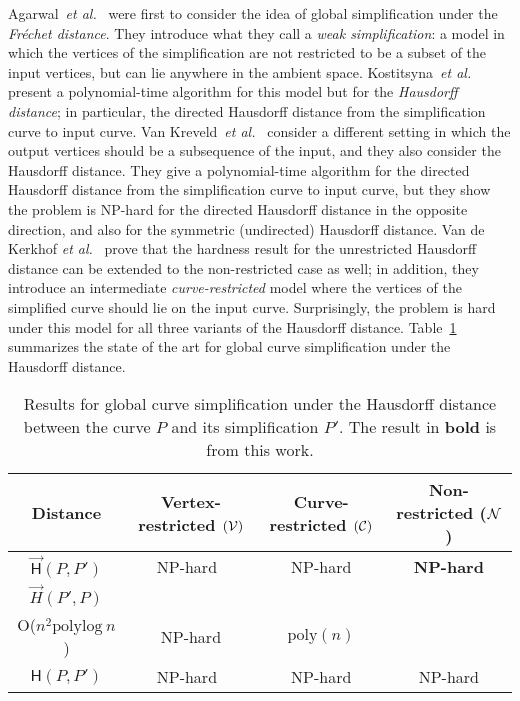 \documentclass[]{llncs}
\newcommand{\etal}{{\it et al.\xspace}}
\def\C{{\cal C}}
\def\N{{\cal N}}
\def\V{{\cal V}}
\newcommand{\Hausdorff}{\mathsf{H}}
\newcommand{\diHausdorff}{\overrightarrow{\mathsf{H}}}
\newcommand {\tablecell}[1]
{
  \begin {minipage} {3.5cm}
  \centering
  #1
  \end {minipage}
}
\newcommand {\tablerow}[4]
{
  #1
  & \tablecell{#2}
  & \tablecell{#3}
  & \tablecell{#4}
  \\
}
\newcommand{\polylog}{\mathrm{polylog}}
\newcommand{\poly}{\mathrm{poly}}
\begin{document}
Agarwal~\etal~\cite {ahmw-nltaa-05} were first to consider the idea of global simplification under the {\em Fr\'echet distance}. They introduce what they call a {\em weak simplification}: a model in which the vertices of the simplification are not restricted to be a subset of the input vertices, but can lie anywhere in the ambient space. 
Kostitsyna~\etal~\cite{klps-ocmlpp-17} present a polynomial-time algorithm for this model but for the {\em Hausdorff distance}; in particular, the directed  Hausdorff distance from the simplification curve to input curve.
Van Kreveld~\etal~\cite{klw-oopsihfd-18} consider a different setting in which the output vertices should be a subsequence of the input, and they also consider the Hausdorff distance. They give a polynomial-time algorithm for the directed  Hausdorff distance from the simplification curve to input curve, but they show the problem is NP-hard for the directed Hausdorff distance in the opposite direction, and also for the symmetric (undirected) Hausdorff distance.
Van de Kerkhof \etal~\cite {kklmw-gcs-19} prove that the hardness result for the unrestricted Hausdorff distance can be extended to the non-restricted case as well; in addition, they introduce an intermediate {\em curve-restricted} model where the vertices of the simplified curve should lie on the input curve. Surprisingly, the problem is hard under this model for all three variants of the Hausdorff distance.
Table~\ref {tab:results} summarizes the state of the art for global curve simplification under the Hausdorff distance.


\begin{table}[!ht]
\centering %
\caption{Results for global curve simplification under the Hausdorff distance between the curve $P$ and its simplification $P'$. The result in {\bf bold} is from this work.}
\begin{tabular}[c]{|c|c|c|c|}
\hline %
Distance & Vertex-restricted $(\V)$ & Curve-restricted $(\C)$ & Non-restricted ($\N$)\\ 
\hline \hline
\tablerow{$\diHausdorff(P,P')$}
{ 
  NP-hard~\cite{klw-oopsihfd-18}
}
{ 
  NP-hard 
  \cite{kklmw-gcs-19}
}
{ 
  \bf NP-hard 
}
\hline
\tablerow{$\overrightarrow{H}(P',P)$}
{ 
  $O(n^4)$~\cite{klw-oopsihfd-18} \\
  O($n^2\polylog\ n$)
  \cite{kklmw-gcs-19}
}
{ 
  NP-hard 
  \cite{kklmw-gcs-19}
}
{ 
  $\poly(n)$ \cite{klps-ocmlpp-17}
}
\hline
\tablerow{$\Hausdorff(P,P')$}
{ 
  NP-hard~\cite{klw-oopsihfd-18}
}
{ 
  NP-hard
  \cite{kklmw-gcs-19}
}
{ 
  NP-hard 
  \cite{kklmw-gcs-19}
}
\hline
\end{tabular}

\label{tab:results}
\end{table}
\end{document}
